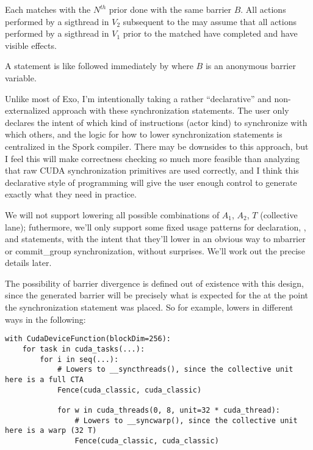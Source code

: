 \filbreak
Each  matches with the $N^{th}$ prior  done with the same barrier $B$.
All actions performed by a sigthread in $V_2$ subsequent to the  may assume that all actions performed by a sigthread in $V_1$ prior to the matched  have completed and have visible effects.

\filbreak
A  statement is like  followed immediately by  where $B$ is an anonymous barrier variable.

\filbreak
Unlike most of Exo, I'm intentionally taking a rather ``declarative'' and non-externalized approach with these synchronization statements.
The user only declares the intent of which kind of instructions (actor kind) to synchronize with which others, and the logic for how to lower synchronization statements is centralized in the Spork compiler.
There may be downsides to this approach, but I feel this will make correctness checking so much more feasible than analyzing that raw CUDA synchronization primitives are used correctly, and I think this declarative style of programming will give the user enough control to generate exactly what they need in practice.

\filbreak
We will not support lowering all possible combinations of $A_1$, $A_2$, $T$ (collective lane); futhermore, we'll only support some fixed usage patterns for  declaration, , and  statements, with the intent that they'll lower in an obvious way to mbarrier or commit\_group synchronization, without surprises.
We'll work out the precise details later.

\filbreak
{}
The possibility of barrier divergence is defined out of existence with this design, since the generated barrier will be precisely what is expected for the  at the point the synchronization statement was placed.
So for example,  lowers in different ways in the following:
{\color{lightttColor}
\begin{verbatim}
with CudaDeviceFunction(blockDim=256):
    for task in cuda_tasks(...):
        for i in seq(...):
            # Lowers to __syncthreads(), since the collective unit here is a full CTA
            Fence(cuda_classic, cuda_classic)

            for w in cuda_threads(0, 8, unit=32 * cuda_thread):
                # Lowers to __syncwarp(), since the collective unit here is a warp (32 T)
                Fence(cuda_classic, cuda_classic)
\end{verbatim}
}

